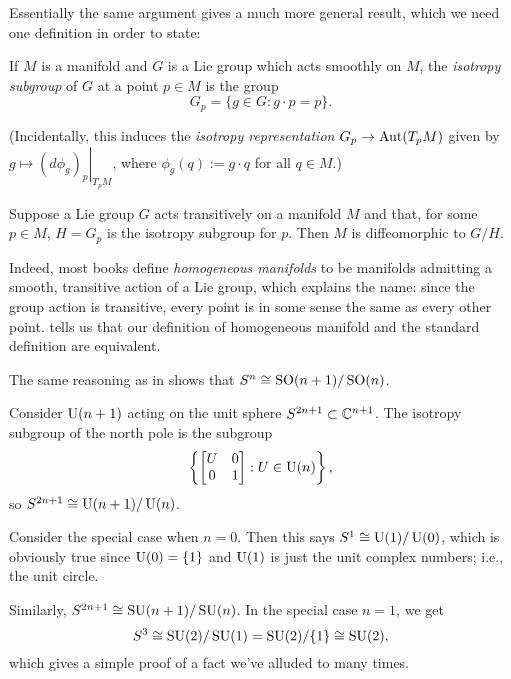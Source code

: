 Essentially the same argument gives a much more general result, which we need one definition in order to state:

\begin{definition}\label{def:isotropy subgroup}
	If $M$ is a manifold and $G$ is a Lie group which acts smoothly on $M$, the \emph{isotropy subgroup} of $G$ at a point $p \in M$ is the group
	\[
		G_p = \{g\in G : g \cdot p = p\}.
	\]
\end{definition}

(Incidentally, this induces the \emph{isotropy representation} $G_p \to \operatorname{Aut}(T_pM)$ given by $g \mapsto \left.(d \phi_g)_p \right|_{T_pM}$, where $\phi_g(q) := g \cdot q$ for all $q \in M$.)

\begin{theorem}\label{thm:homogeneous and isotropy}
	Suppose a Lie group $G$ acts transitively on a manifold $M$ and that, for some $p \in M$, $H = G_p$ is the isotropy subgroup for $p$. Then $M$ is diffeomorphic to $G/H$.
\end{theorem}

Indeed, most books define \emph{homogeneous manifolds} to be manifolds admitting a smooth, transitive action of a Lie group, which explains the name: since the group action is transitive, every point is in some sense the same as every other point.  tells us that our definition of homogeneous manifold and the standard definition are equivalent.

\begin{example}
	The same reasoning as in  shows that $S^n \cong \operatorname{SO}(n+1)/\operatorname{SO}(n)$.
\end{example}

\begin{example}\label{ex:u(n+1) on sphere}
	Consider $\operatorname{U}(n+1)$ acting on the unit sphere $S^{2n+1} \subset \mathbb{C}^{n+1}$. The isotropy subgroup of the north pole is the subgroup
	\[
		\left\{ \begin{bmatrix} U & 0 \\ 0 & 1 \end{bmatrix} : U \in \operatorname{U}(n)\right\},
	\]
	so $S^{2n+1} \cong \operatorname{U}(n+1)/\operatorname{U}(n)$.
	
	Consider the special case when $n=0$. Then this says $S^1 \cong \operatorname{U}(1)/\operatorname{U}(0)$, which is obviously true since $\operatorname{U}(0) = \{1\}$ and $\operatorname{U}(1)$ is just the unit complex numbers; i.e., the unit circle.
\end{example}

\begin{example}\label{ex:su(n+1) on sphere}
	Similarly, $S^{2n+1} \cong \operatorname{SU}(n+1)/\operatorname{SU}(n)$. In the special case $n=1$, we get 
	\[
		S^3 \cong \operatorname{SU}(2)/\operatorname{SU}(1) = \operatorname{SU}(2)/\{1\} \cong \operatorname{SU}(2),
	\]
	which gives a simple proof of a fact we've alluded to many times.
\end{example}
